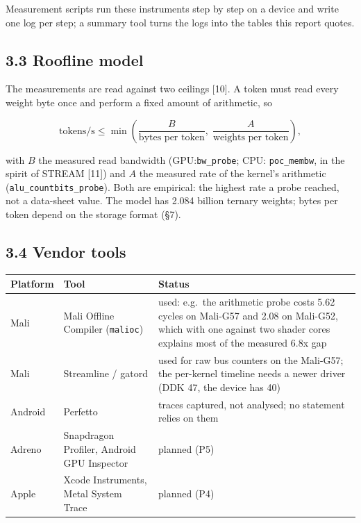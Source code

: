 \documentclass[
  10pt,
]{article}
\newcounter{none} %
\begin{document}
Measurement scripts run these instruments step by step on a device and
write one log per step; a summary tool turns the logs into the tables
this report quotes.

\subsection{3.3 Roofline model}\label{roofline-model}

The measurements are read against two ceilings [10]. A token must
read every weight byte once and perform a fixed amount of arithmetic, so

\[
\text{tokens/s} \le\min\left(\frac{B}{\text{bytes per token}},\;
\frac{A}{\text{weights per token}}\right),
\]

with \(B\) the measured read bandwidth (GPU:\@ \texttt{bw\_probe}; CPU:\@
\texttt{poc\_membw}, in the spirit of STREAM [11]) and \(A\) the
measured rate of the kernel's arithmetic
(\texttt{alu\_countbits\_probe}). Both are empirical: the highest rate a
probe reached, not a data-sheet value. The model has 2.084 billion
ternary weights; bytes per token depend on the storage format (\S{}7).

\subsection{3.4 Vendor tools}\label{vendor-tools}

{\def\LTcaptype{none} %
\begin{longtable}[]{@{}
  >{\raggedright\arraybackslash}p{}
  >{\raggedright\arraybackslash}p{}
  >{\raggedright\arraybackslash}p{}@{}}
\toprule\noalign{}
\begin{minipage}[b]{\linewidth}\raggedright%
Platform
\end{minipage} & \begin{minipage}[b]{\linewidth}\raggedright%
Tool
\end{minipage} & \begin{minipage}[b]{\linewidth}\raggedright%
Status
\end{minipage} \\
\midrule\noalign{}
\endhead%
\bottomrule\noalign{}
\endlastfoot%
Mali & Mali Offline Compiler (\texttt{malioc}) & used: e.g.~the
arithmetic probe costs 5.62 cycles on Mali-G57 and 2.08 on Mali-G52,
which with one against two shader cores explains most of the measured
6.8x gap \\
Mali & Streamline / gatord & used for raw bus counters on the Mali-G57;
the per-kernel timeline needs a newer driver (DDK 47, the device has
40) \\
Android & Perfetto & traces captured, not analysed; no statement relies
on them \\
Adreno & Snapdragon Profiler, Android GPU Inspector & planned (P5) \\
Apple & Xcode Instruments, Metal System Trace & planned (P4) \\
\end{longtable}
}
\end{document}
